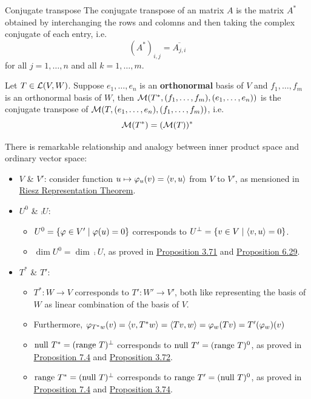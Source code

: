\documentclass[12pt,a4paper]{article}
\begin{document}
    \begin{defi}{Conjugate transpose}%
        The conjugate transpose of an  matrix $A$ is the  matrix $A^*$ obtained by interchanging the rows and colomns and then taking the complex conjugate of each entry, i.e. 
        $$
        (A^*)_{i,j}=\overline{A_{j,i}}
        $$
        for all $j=1,\dots,n$ and all $k=1,\dots,m$.
    \end{defi}
    \hfill

    \begin{prop}
        Let $T\in\mathcal{L}(V,W)$. Suppose $e_1,\dots,e_n$ is an \textbf{orthonormal} basis of $V$ and $f_1,\dots,f_m$ is an orthonormal basis of $W$, then $\mathcal{M}(T^*,(f_1,\dots,f_m),(e_1,\dots,e_n))$ is the conjugate transpose of $\mathcal{M}(T,(e_1,\dots,e_n),(f_1,\dots,f_m))$, i.e. 
        $$
        \mathcal{M}(T^*)=(\mathcal{M}(T))^*
        $$
    \end{prop}
    \hfill

    \begin{remark}
        There is remarkable relationship and analogy between inner product space and ordinary vector space:
        \begin{itemize}
            \item $V$ \& $V'$:
            consider function $u\mapsto \varphi_u(v)=\langle v,u\rangle$ from $V$ to $V'$, as mensioned in \hyperref[6.25]{Riesz Representation Theorem}.
            
            \item $U^0$ \& $\comp{U}$:
            \begin{itemize}
                \item $U^0=\left\{\varphi\in V'\mid\varphi(u)=0\right\}$ corresponds to $U^{\perp}=\left\{v\in V\mid\langle v,u\rangle=0\right\}$.
                \item $\dim U^0=\dim \comp{U}$, as proved in \hyperref[3.71]{Proposition 3.71} and \hyperref[6.29]{Proposition 6.29}.
            \end{itemize}
            
            \item $T^*$ \& $T'$:
            \begin{itemize}
                \item $T^*:W\to V$ corresponds to $T':W'\to V'$, both like representing the basis of $W$ as linear combination of the basis of $V$.
                \item Furthermore, $\varphi_{T^*w}(v)=\langle v,T^*w\rangle=\langle Tv,w\rangle=\varphi_w(Tv)=T'(\varphi_w)(v)$
                \item $\operatorname{null\,} T^*=(\operatorname{range\,} T)^{\perp}$ corresponds to $\operatorname{null\,} T'=(\operatorname{range\,} T)^0$, as proved in \hyperref[7.4]{Proposition 7.4} and \hyperref[3.72]{Proposition 3.72}.
                \item $\operatorname{range\,} T^*=(\operatorname{null\,} T)^{\perp}$ corresponds to $\operatorname{range\,} T'=(\operatorname{null\,} T)^0$, as proved in \hyperref[7.4]{Proposition 7.4} and \hyperref[3.74]{Proposition 3.74}.
            \end{itemize}
        \end{itemize}
    \end{remark}
    \hfill
\end{document}
